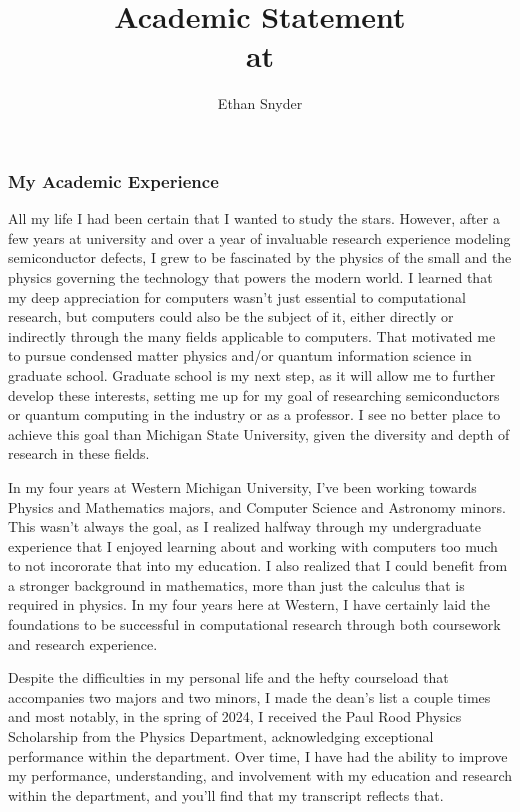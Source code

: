 \documentclass[11pt]{article}
\title{Academic Statement\\
	\large \dept{} at \school{}}
\author{Ethan Snyder}
\newcommand{\school}{Michigan State University}
\begin{document}
\maketitle
\subsubsection*{My Academic Experience}
All my life I had been certain that I wanted to study the stars. However, after a few years at university and over a year of invaluable research experience modeling semiconductor defects, I grew to be fascinated by the physics of the small and the physics governing the technology that powers the modern world. I learned that my deep appreciation for computers wasn't just essential to computational research, but computers could also be the subject of it, either directly or indirectly through the many fields applicable to computers. That motivated me to pursue condensed matter physics {}and/or quantum information science in graduate school. Graduate school is my next step, as it will allow me to further develop these interests, setting me up for my goal of researching semiconductors or quantum computing in the industry or as a professor. I see no better place to achieve this goal than \school{}, given the diversity and depth of research in these fields.

In my four years at Western Michigan University, I've been working towards Physics and Mathematics majors, and Computer Science and Astronomy minors. This wasn't always the goal, as I realized halfway through my undergraduate experience that I enjoyed learning about and working with computers too much to not incororate that into my education. I also realized that I could benefit from a stronger background in mathematics, more than just the calculus that is required in physics. In my four years here at Western, I have certainly laid the foundations to be successful in computational research through both coursework and research experience.

Despite the difficulties in my personal life and the hefty courseload that accompanies two majors and two minors, I made the dean's list a couple times and most notably, in the spring of 2024, I received the Paul Rood Physics Scholarship from the Physics Department, acknowledging exceptional performance within the department. Over time, I have had the ability to improve my performance, understanding, and involvement with my education and research within the department, and you'll find that my transcript reflects that.
\end{document}
